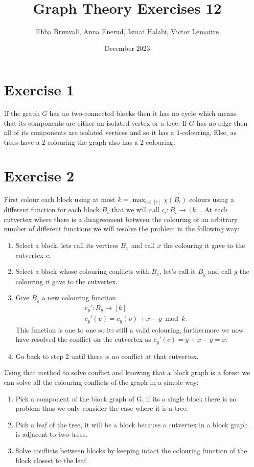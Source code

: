 \documentclass{article}
\title{Graph Theory Exercises 12}
\author{Ebba Brunvall, Anna Enerud, Ismat Halabi, Victor Lemaitre}
\date{December 2023}
\begin{document}
\maketitle

\section*{Exercise 1}
If the graph $G$ has no two-connected blocks then it has no cycle which means that its components are either an isolated vertex or a tree. If $G$ has no edge then all of its components are isolated vertices and so it has a $1$-colouring. Else, as trees have a $2$-colouring the graph also has a $2$-colouring. 

\section*{Exercise 2}
First colour each block using at most $k = \max_{i\in[r]} \chi(B_i)$ colours using a different function for each block $B_i$ that we will call $c_i : B_i \rightarrow [k]$.
At each cutvertex where there is a disagreement between the colouring of an arbitrary number of different functions we will resolve the problem in the following way:
\begin{enumerate}
\item Select a block, lets call its vertices $B_x$ and call $x$ the colouring it gave to the cutvertex $c$.
\item Select a block whose colouring conflicts with $B_x$, let's call it $B_y$ and call $y$ the colouring it gave to the cutvertex.
\item Give $B_y$ a new colouring function
\begin{align*} 
&c_y' : B_y \rightarrow [k] \\ 
&c_y'(v) = c_y(v) + x-y \bmod{k}.
\end{align*}
This function is one to one so its still a valid colouring, furthermore we now have resolved the conflict on the cutvertex as $c_y'(c) = y + x - y = x$.
\item Go back to step 2 until there is no conflict at that cutvertex.
\end{enumerate}

Using that method to solve conflict and knowing that a block graph is a forest we can solve all the colouring conflicts of the graph in a simple way:
\begin{enumerate}
\item Pick a component of the block graph of G, if its a single block there is no problem thus we only consider the case where it is a tree.
\item Pick a leaf of the tree, it will be a block because a cutvertex in a block graph is adjacent to two trees.
\item Solve conflicts between blocks by keeping intact the colouring function of the block closest to the leaf.

\end{enumerate}
\end{document}
